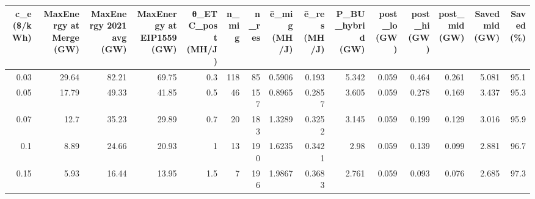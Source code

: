 \begin{tabular}{rrrrrrrrrrrrrrr}
\toprule
 c\_e (\$/kWh) &  MaxEnergy at Merge (GW) &  MaxEnergy 2021 avg (GW) &  MaxEnergy at EIP1559 (GW) &  θ\_ETC\_post (MH/J) &  n\_mig &  n\_res &  ē\_mig (MH/J) &  ē\_res (MH/J) &  P\_BU\_hybrid (GW) &  post\_lo (GW) &  post\_hi (GW) &  post\_mid (GW) &  Saved mid (GW) &  Saved (\%) \\
\midrule
        0.03 &                    29.64 &                    82.21 &                      69.75 &                0.3 &    118 &     85 &        0.5906 &         0.193 &             5.342 &         0.059 &         0.464 &          0.261 &           5.081 &       95.1 \\
        0.05 &                    17.79 &                    49.33 &                      41.85 &                0.5 &     46 &    157 &        0.8965 &        0.2857 &             3.605 &         0.059 &         0.278 &          0.169 &           3.437 &       95.3 \\
        0.07 &                     12.7 &                    35.23 &                      29.89 &                0.7 &     20 &    183 &        1.3289 &        0.3252 &             3.145 &         0.059 &         0.199 &          0.129 &           3.016 &       95.9 \\
         0.1 &                     8.89 &                    24.66 &                      20.93 &                  1 &     13 &    190 &        1.6235 &        0.3421 &              2.98 &         0.059 &         0.139 &          0.099 &           2.881 &       96.7 \\
        0.15 &                     5.93 &                    16.44 &                      13.95 &                1.5 &      7 &    196 &        1.9867 &        0.3683 &             2.761 &         0.059 &         0.093 &          0.076 &           2.685 &       97.3 \\
\bottomrule
\end{tabular}
